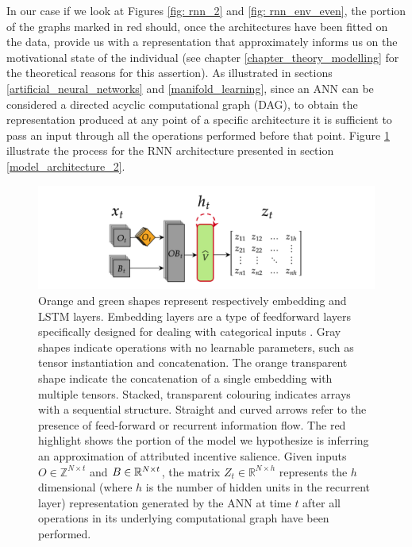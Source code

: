 In our case if we look at Figures \ref{fig: rnn_2} and \ref{fig: rnn_env_even}, the portion of the graphs marked in red should, once the architectures have been fitted on the data,  provide us with a representation that approximately informs us on the motivational state of the individual (see chapter \ref{chapter_theory_modelling} for the theoretical reasons for this assertion). As illustrated in sections \ref{artificial_neural_networks} and \ref{manifold_learning}, since an ANN can be considered a directed acyclic computational graph (DAG), to obtain the representation produced at any point of a specific architecture it is sufficient to pass an input through all the operations performed before that point. Figure \ref{fig: repr_extr} illustrate the process for the RNN architecture presented in section \ref{model_architecture_2}.
\begin{figure}[h]
  \centering
  \includegraphics[width=\textwidth]{images/chapter_4/representation_extractor.png}
    \caption[\textbf{The procedure for generating latent representations generated by an ANN}]{Orange and green shapes represent respectively embedding and LSTM layers. Embedding layers are a type of feedforward layers specifically designed for dealing with categorical inputs \cite{chollet2015keras}. Gray shapes indicate operations with no learnable parameters, such as tensor instantiation and concatenation. The orange transparent shape indicate the concatenation of a single embedding with multiple tensors. Stacked, transparent colouring indicates arrays with a sequential structure. Straight and curved arrows refer to the presence of feed-forward or recurrent information flow. The red highlight shows the portion of the model we hypothesize is inferring an approximation of attributed incentive salience. Given inputs $O \in \mathbb{Z}^{N \times t}$ and $B \in \mathbb{R}^{N \times t \time 5}$, the matrix $Z_t \in \mathbb{R}^{N \times h}$ represents the $h$ dimensional (where $h$ is the number of hidden units in the recurrent layer) representation generated by the ANN at time $t$ after all operations in its underlying computational graph have been performed.}
    \label{fig: repr_extr}
\end{figure}

